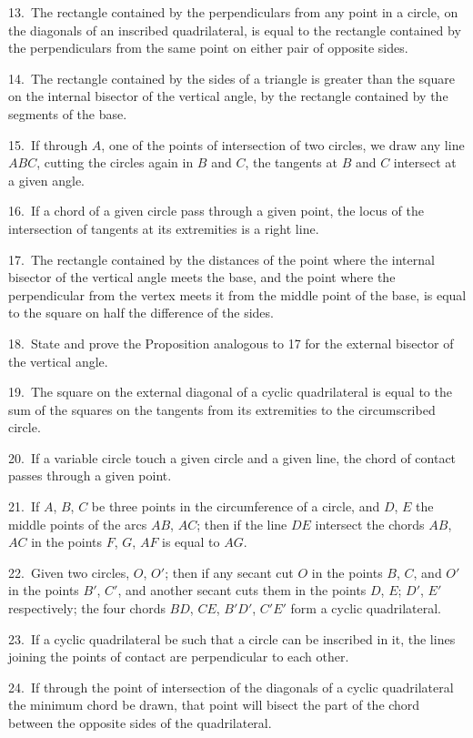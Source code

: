 \documentclass[oneside]{book}
\begin{document}
\begin{footnotesize}
13.~The rectangle contained by the perpendiculars from any
point in a circle, on the diagonals of an inscribed quadrilateral, is
equal to the rectangle contained by the perpendiculars from the
same point on either pair of opposite sides.

14.~The rectangle contained by the sides of a triangle is
greater than the square on the internal bisector of the vertical
angle, by the rectangle contained by the segments of the base.

15.~If through $A$, one of the points of intersection of two
circles, we draw any line $ABC$, cutting the circles again in
$B$ and $C$, the tangents at $B$ and $C$ intersect at a given angle.

16.~If a chord of a given circle pass through a given point, the
locus of the intersection of tangents at its extremities is a right
line.

17.~The rectangle contained by the distances of the point where
the internal bisector of the vertical angle meets the base, and the
point where the perpendicular from the vertex meets it from the
middle point of the base, is equal to the square on half the difference
of the sides.

18.~State and prove the Proposition analogous to 17 for the
external bisector of the vertical angle.

19.~The square on the external diagonal of a cyclic quadrilateral
is equal to the sum of the squares on the tangents from
its extremities to the circumscribed circle.

20.~If a variable circle touch a given circle and a given line,
the chord of contact passes through a given point.

21.~If $A$, $B$, $C$ be three points in the circumference of a circle,
and $D$, $E$ the middle points of the arcs $AB$, $AC$; \label{theifthen}then if the line
$DE$ intersect the chords $AB$, $AC$ in the points $F$, $G$, $AF$ is equal
to $AG$.

22.~Given two circles, $O$, $O'$; then if any secant cut $O$ in the
points $B$, $C$, and $O'$ in the points $B'$, $C'$, and another secant cuts
them in the points $D$, $E$; $D'$, $E'$ respectively; the four chords
$BD$, $CE$, $B'D'$, $C'E'$ form a cyclic quadrilateral.

23.~If a cyclic quadrilateral be such that a circle can be
inscribed in it, the lines joining the points of contact are perpendicular
to each other.

24.~If through the point of intersection of the diagonals of a
cyclic quadrilateral the minimum chord be drawn, that point will
bisect the part of the chord between the opposite sides of the
quadrilateral.


\end{footnotesize}
\end{document}
